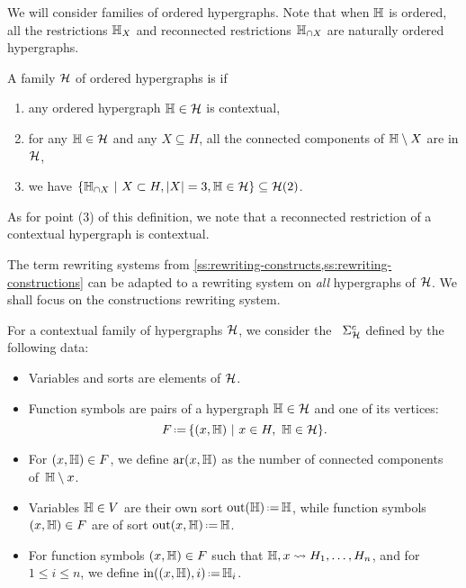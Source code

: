 We will consider families of ordered hypergraphs. 
Note that when ${\mathbb H}$ is ordered, all the restrictions ${\mathbb H}_X$ and reconnected restrictions ${\mathbb H}_{\cap X}$ are naturally ordered hypergraphs.

\begin{definition}
  \label{def:contextual-family}
    A family $\mathcal{H}$ of ordered hypergraphs is  if 
    \begin{enumerate}
      \item any ordered hypergraph ${\mathbb H} \in \mathcal{H}$ is contextual,
      \item for any ${\mathbb H} \in \mathcal{H}$ and any $X \subseteq H$, all the connected components of ${\mathbb H}\setminus X$ are in $\mathcal{H}$,
      \item we have $\{{\mathbb H}_{\cap X} \ | \ X \subset H, |X|=3, {\mathbb H} \in \mathcal{H} \} \subseteq \mathcal{H}(2)$.
    \end{enumerate}
\end{definition}
As for point (3) of this definition, we note that a reconnected restriction of a contextual hypergraph is contextual.

The term rewriting systems from \cref{ss:rewriting-constructs,ss:rewriting-constructions} can be adapted to a rewriting system on \emph{all} hypergraphs of $\mathcal{H}$.
We shall focus on the constructions rewriting system. 

\begin{definition}
  For a contextual family of hypergraphs $\mathcal{H}$, we consider the ~$\Sigma_{\mathcal{H}}^c$ defined by the following data:
  \begin{itemize}
    \item Variables and sorts are elements of $\mathcal{H}$.
    \item Function symbols are pairs of a hypergraph ${\mathbb H} \in \mathcal{H}$ and one of its vertices:
    $$F\eqdef \{(x,\hyper{H}) \ | \ x \in H, \ \hyper{H} \in \calH \}.$$
    \item For $(x,{\mathbb H}) \in F$, we define $\mathrm{ar}(x,{\mathbb H})$ as the number of connected components of~${\mathbb H} \setminus {x}$.
    \item Variables ${\mathbb H} \in V$ are their own sort $\outsort(\hyper{H})\eqdef \hyper{H}$, while function symbols~$(x,{\mathbb H}) \in F$ are of sort $\outsort(x,\hyper{H})\eqdef \hyper{H}$.
    \item For function symbols $(x,{\mathbb H}) \in F$ such that ${\mathbb H},x \leadsto H_1,\ldots,H_n$, and for $1 \leq i \leq n$, we define $\insort((x,\hyper{H}),i)\eqdef \hyper{H}_i$.
  \end{itemize}
\end{definition}


